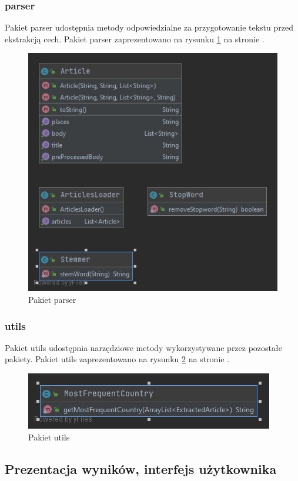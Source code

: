 \documentclass{classrep}
\begin{document}
\subsubsection{parser}
Pakiet parser udostępnia metody odpowiedzialne za przygotowanie tekstu przed ekstrakcją cech. Pakiet parser zaprezentowano na rysunku \ref{prs} na stronie \pageref{prs}.

\begin{figure}[H]
\label{prs}
\includegraphics[scale=0.5]{Package parser}
\caption{Pakiet parser}
\end{figure}


\subsubsection{utils}
Pakiet utils udostępnia narzędziowe metody wykorzystywane przez pozostałe pakiety.  Pakiet utils zaprezentowano na rysunku \ref{utls} na stronie \pageref{utls}.
\begin{figure}[H]
\label{utls}
\includegraphics[scale=0.5]{Package utils}
\caption{Pakiet utils}
\end{figure}

\subsection{Prezentacja wyników, interfejs użytkownika} 
\end{document}
